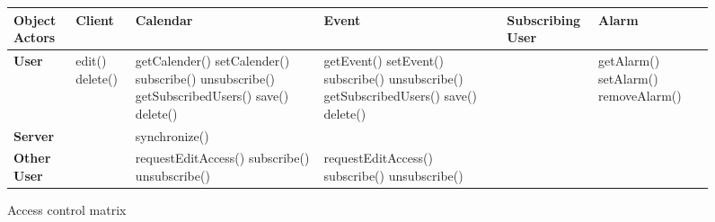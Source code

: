 \begin{figure}[hbp]
\hspace*{-1.5cm}\begin{tabular}{|p{1.8cm}|p{1.6cm}|p{3.7cm}|p{3.7cm}|p{2.2cm}|p{2.6cm}|}
\hline
\textbf{Object Actors}
&
\textbf{Client}
&
\textbf{Calendar}
&
\textbf{Event}
&
\textbf{\mbox{Subscribing} User}
&
\textbf{Alarm} \\
\hline
\textbf{User}
& 
edit() \newline
delete() \newline
& 
getCalender()  \newline
setCalender()  \newline
subscribe() \newline
unsubscribe() \newline
getSubscribedUsers() \newline
save() \newline
delete() \newline
&
getEvent()  \newline
setEvent() \newline
subscribe() \newline
unsubscribe() \newline
getSubscribedUsers() \newline
save() \newline
delete() \newline
&
&
getAlarm()  \newline
setAlarm() \newline
removeAlarm() \newline
 \\ \hline
\textbf{Server}
& 
& 
synchronize() \newline
&
&
&
 \\ \hline
\textbf{Other User}
& 
& 
requestEditAccess()  \newline
subscribe()   \newline
unsubscribe() \newline
& 
requestEditAccess()  \newline
subscribe()  \newline
unsubscribe() \newline
& 
& 
 \\ \hline
\end{tabular}
\caption{\label{fig:AccessControlMatrix}Access control matrix}
\end{figure}